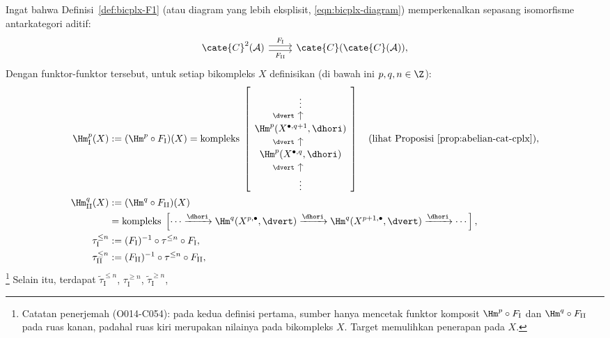 Ingat bahwa Definisi~\ref{def:bicplx-F1} (atau diagram yang lebih eksplisit,
\eqref{eqn:bicplx-diagram}) memperkenalkan sepasang isomorfisme antarkategori
aditif:
\[\begin{tikzcd}
	\cate{C}^2(\mathcal{A}) \arrow[r, shift left, "{F_{\mathrm{I}}}"] \arrow[r, shift right, "{F_{\mathrm{II}}}"'] & \cate{C}(\cate{C}(\mathcal{A})) ,
\end{tikzcd}\]
Dengan funktor-funktor tersebut, untuk setiap bikompleks $X$ definisikan
(di bawah ini $p, q, n \in \Z$):
\begin{align*}
	\Hm_{\mathrm{I}}^p(X) & := (\Hm^p \circ F_{\mathrm{I}})(X)
	= \text{kompleks}\; \left[ \begin{tikzcd}[row sep=small]
		\vdots \\
		\Hm^p(X^{\bullet, q+1}, \dhori) \arrow[u, "{\dvert}" inner sep=0.6em] \\
		\Hm^p(X^{\bullet, q}, \dhori) \arrow[u, "{\dvert}" inner sep=0.6em] \\
		\vdots \arrow[u, "{\dvert}" inner sep=0.6em]
	\end{tikzcd}\right] \quad \text{(lihat Proposisi~\ref{prop:abelian-cat-cplx})}, \\
	\Hm_{\mathrm{II}}^q(X) & := (\Hm^q \circ F_{\mathrm{II}})(X) \\
	& = \text{kompleks}\; \left[ \cdots \xrightarrow{\dhori} \Hm^q(X^{p, \bullet}, \dvert) \xrightarrow{\dhori} \Hm^q(X^{p+1, \bullet}, \dvert) \xrightarrow{\dhori} \cdots \right] , \\
	\tau_{\mathrm{I}}^{\leq n} & := (F_{\mathrm{I}})^{-1} \circ \tau^{\leq n} \circ F_{\mathrm{I}}, \\
	\tau_{\mathrm{II}}^{\leq n} & := (F_{\mathrm{II}})^{-1} \circ \tau^{\leq n} \circ F_{\mathrm{II}},
\end{align*}  %
\footnote{Catatan penerjemah (O014-C054): pada kedua definisi pertama,
sumber hanya mencetak funktor komposit $\Hm^p\circ F_{\mathrm{I}}$ dan
$\Hm^q\circ F_{\mathrm{II}}$ pada ruas kanan, padahal ruas kiri merupakan
nilainya pada bikompleks $X$. Target memulihkan penerapan pada $X$.}
Selain itu, terdapat $\tilde{\tau}_{\mathrm{I}}^{\leq n}$,
$\tau_{\mathrm{I}}^{\geq n}$, $\tilde{\tau}_{\mathrm{I}}^{\geq n}$,
